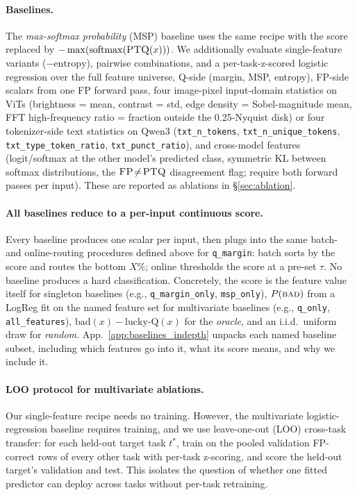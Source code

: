 \documentclass{article}
\newcommand{\fp}{\textsc{FP}\xspace}
\newcommand{\ptq}{\textsc{PTQ}\xspace}
\newcommand{\bad}{\textsc{bad}\xspace}
\begin{document}
\paragraph{Baselines.}
The \emph{max-softmax probability} (MSP) baseline uses the same recipe with the score replaced by $-\max(\mathrm{softmax}(\ptq(x)))$. We additionally evaluate single-feature variants ($-\mathrm{entropy}$), pairwise combinations, and a per-task-z-scored logistic regression over the full feature universe, Q-side (margin, MSP, entropy), \fp{}-side scalars from one \fp{} forward pass, four image-pixel input-domain statistics on ViTs (brightness = mean, contrast = std, edge density = Sobel-magnitude mean, FFT high-frequency ratio = fraction outside the 0.25-Nyquist disk) or four tokenizer-side text statistics on Qwen3 (\texttt{txt\_n\_tokens}, \texttt{txt\_n\_unique\_tokens}, \texttt{txt\_type\_token\_ratio}, \texttt{txt\_punct\_ratio}), and cross-model features (logit/softmax at the other model's predicted class, symmetric KL between softmax distributions, the $\fp\!\neq\!\ptq$ disagreement flag; require both forward passes per input). These are reported as ablations in \S\ref{sec:ablation}.

\paragraph{All baselines reduce to a per-input continuous score.}
Every baseline produces one scalar per input, then plugs into the same batch- and online-routing procedures defined above for \texttt{q\_margin}: batch sorts by the score and routes the bottom $X\%$; online thresholds the score at a pre-set $\tau$. No baseline produces a hard classification. Concretely, the score is the feature value itself for singleton baselines (e.g., \texttt{q\_margin\_only}, \texttt{msp\_only}), $P(\bad)$ from a LogReg fit on the named feature set for multivariate baselines (e.g., \texttt{q\_only}, \texttt{all\_features}), $\text{bad}(x) - \text{lucky-Q}(x)$ for the \emph{oracle}, and an i.i.d.\ uniform draw for \emph{random}. App.~\ref{app:baselines_indepth} unpacks each named baseline subset, including which features go into it, what its score means, and why we include it.

\paragraph{LOO protocol for multivariate ablations.}
Our single-feature recipe needs no training. However, the multivariate logistic-regression baseline requires training, and we use leave-one-out (LOO) cross-task transfer: for each held-out target task $t^\ast$, train on the pooled validation \fp{}-correct rows of every other task with per-task z-scoring, and score the held-out target's validation and test. This isolates the question of whether one fitted predictor can deploy across tasks without per-task retraining.
\end{document}
